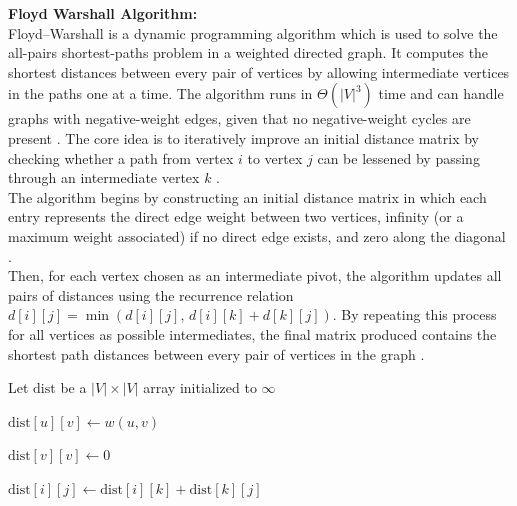 \documentclass[a4paper,12pt]{article}
\begin{document}
\noindent
\textbf{Floyd Warshall Algorithm: }\\
\noindent  
Floyd--Warshall is a dynamic programming algorithm which is used to solve the all-pairs shortest-paths problem in a weighted directed graph. It computes the shortest distances between every pair of vertices by  allowing intermediate vertices in the paths one at a time. The algorithm runs in $\Theta(|V|^3)$ time and can handle graphs with negative-weight edges, given that no negative-weight cycles are present \cite{CLRS}. The core idea is to iteratively improve an initial distance matrix by checking whether a path from vertex $i$ to vertex $j$ can be lessened by passing through an intermediate vertex $k$ \cite{floyd_warshall_wikipedia}. \\ 

\noindent
The algorithm begins by constructing an initial distance matrix in which each entry represents the direct edge weight between two vertices, infinity (or a maximum weight associated) if no direct edge exists, and zero along the diagonal \cite{tutorialspoint_floyd_warshall}.\\
\noindent
Then, for each vertex chosen as an intermediate pivot, the algorithm updates all pairs of distances using the recurrence relation
$d[i][j] = \min(d[i][j],\, d[i][k] + d[k][j])$. By repeating this process for all vertices as possible intermediates, the final matrix produced contains the shortest path distances between every pair of vertices in the graph \cite{CLRS, cp_algorithms_floyd_warshall}.\\

\begin{algorithm}[H]
\caption{Floyd--Warshall Algorithm\cite{CLRS}}
\begin{algorithmic}[1]
\STATE Let $\text{dist}$ be a $|V| \times |V|$ array initialized to $\infty$

    \STATE $\text{dist}[u][v] \leftarrow w(u,v)$
\ENDFOR

    \STATE $\text{dist}[v][v] \leftarrow 0$
\ENDFOR

                \STATE $\text{dist}[i][j] \leftarrow \text{dist}[i][k] + \text{dist}[k][j]$
            \ENDIF
        \ENDFOR
    \ENDFOR
\ENDFOR

\end{algorithmic}
\end{algorithm}
\end{document}
